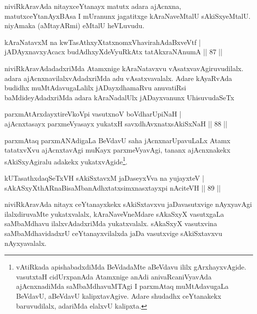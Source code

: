 \begin{artha}
niviRkAravAda nitayxceYtanayx matutx adara ajAcnxna, matutx\break ceYtanAyxBAsa I mUranunx jagatitxge kAraNaveMtalU sAkiSxyeMtalU. niyAmaka (aMtayARmi) eMtalU heVLuvudu.
\end{artha}

\begin{shl}
kAraNatavxM na kwTasAthxyXtatxnomxVhavirahAdaBxveVtf |\\
jADAyxnavxyAcacx budAdhxyXdeVyuRkAtx tatAkxraNAnumA \hfill || 87 ||
\end{shl}

\begin{artha}
niviRkAravAdadadxriMda Atamxnige kAraNatavxvu vAsatxvavAgiruvudilalx. adara ajAcnxnavilalxvAdadxriMda adu vAsatxvavalalx. Adare kAyaRvAda budidhx muMtAdavugaLalilx jADayxdhamaRvu anuvatiRsi baMdideyAdadxriMda adara kAraNadalUlx jADayxvanunx UhisuvudaSeTx
\end{artha}	

\begin{shl}
parxmAtArxdayxtireVkoV\s pi vasutxnoV boVdharUpiNaH |\\
ajAcnxtasayx parxmeVyasayx yukatxH savxdhAvxnatxsAkiSxNaH \hfill || 88 ||
\end{shl}

\begin{artha}%
parxmAtaq parxmANAdigaLa BeVdavU saha jAcnxnarUpavuLaLx Atamx tatatxvXvu ajAcnxtavAgi muKayx parxmeVyavAgi, tananx ajAcnxnakekx sAkiSxyAgiralu adakekx yukatxvAgide\footnote{vAtiRkada apishabadxdiMda BeVdadaMte aBeVdavu ililx gArxhayxvAgide. vasutxtaH cidUrxpanAda Atamxnige anAdi anivaRcaniVyavAda ajAcnxnadiMda saMbaMdhavuMTAgi I parxmAtaq muMtAdavugaLa BeVdavU, aBeVdavU kalipxtavAgive. Adare shudadhx ceYtanakekx baruvudilalx, adariMda elalxvU kalipxta.}.
\end{artha}


\begin{shl}
kUTasathxdaqSeTxVH sAkiSxtavxM jaDaseyxVva na yujayxteV |\\
sAkASxyXthARnaBisaMbanAdhxtatxsimxnasxtayxpi nAciteVH \hfill || 89 ||
\end{shl}

\begin{artha}
niviRkAravAda nitayx ceYtanayxkekx sAkiSxtavxvu jaDavasutxvige nAyxyavAgi ilalxdiruvaMte yukatxvalalx, kAraNaveVneMdare sAkaSxyX vasutxgaLa saMbaMdhavu ilalxvAdadxriMda yukatxvalalx. sAkaSxyX vasutxvina saMbaMdhavidadxrU ceYtanayxvilalxda jaDa vasutxvige sAkiSxtavxvu nAyxyavalalx.
\end{artha}


